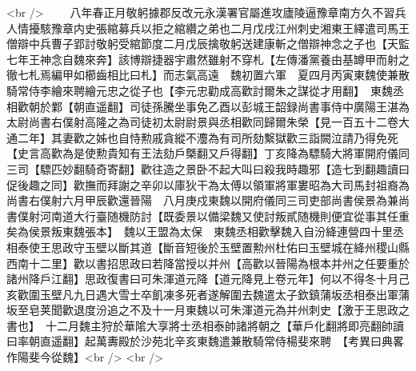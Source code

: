 <br />
　　八年春正月敬躬據郡反改元永漢署官屬進攻廬陵逼豫章南方久不習兵人情擾駭豫章内史張綰募兵以拒之綰纘之弟也二月戊戌江州刺史湘東王繹遣司馬王僧辯中兵曹子郢討敬躬受綰節度二月戊辰擒敬躬送建康斬之僧辯神念之子也【天監七年王神念自魏來奔】該博辯捷器宇肅然雖射不穿札【左傳潘黨養由基罇甲而射之徹七札焉編甲如櫛齒相比曰札】而志氣高遠　魏初置六軍　夏四月丙寅東魏使兼散騎常侍李繪來聘繪元忠之從子也【李元忠勸成高歡討爾朱之謀從才用翻】　東魏丞相歡朝於鄴【朝直遥翻】司徒孫騰坐事免乙酉以彭城王韶録尚書事侍中廣陽王湛為太尉尚書右僕射高隆之為司徒初太尉尉景與丞相歡同歸爾朱榮【見一百五十二卷大通二年】其妻歡之姊也自恃勲戚貪縱不灋為有司所劾繫獄歡三詣闕泣請乃得免死【史言高歡為是使勲貴知有王法劾戶槩翻又戶得翻】丁亥降為驃騎大將軍開府儀同三司【驃匹妙翻騎奇寄翻】歡往造之景卧不起大叫曰殺我時趣邪【造七到翻趣讀曰促後趣之同】歡撫而拜謝之辛卯以庫狄干為太傅以領軍將軍婁昭為大司馬封祖裔為尚書右僕射六月甲辰歡還晉陽　八月庚戍東魏以開府儀同三司吏部尚書侯景為兼尚書僕射河南道大行臺随機防討【既委景以備梁魏又使討叛貳随機則便宜從事其任重矣為侯景叛東魏張本】　魏以王盟為太保　東魏丞相歡擊魏入自汾絳連營四十里丞相泰使王思政守玉壁以斷其道【斷音短後於玉壁置勲州杜佑曰玉壁城在絳州稷山縣西南十二里】歡以書招思政曰若降當授以并州【高歡以晉陽為根本并州之任要重於諸州降戶江翻】思政復書曰可朱渾道元降【道元降見上卷元年】何以不得冬十月己亥歡圍玉壁凡九日遇大雪士卒飢凍多死者遂解圍去魏遣太子欽鎮蒲坂丞相泰出軍蒲坂至皂荚聞歡退度汾追之不及十一月東魏以可朱渾道元為并州刺史【激于王思政之書也】　十二月魏主狩於華隂大享將士丞相泰帥諸將朝之【華戶化翻將即亮翻帥讀曰率朝直遥翻】起萬夀殿於沙苑北辛亥東魏遣兼散騎常侍楊斐來聘　【考異曰典畧作陽斐今從魏】<br />
<br />
